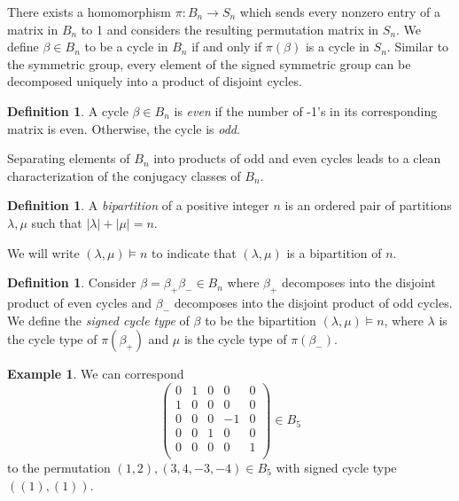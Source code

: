 \documentclass{amsart}
\theoremstyle{plain}
\theoremstyle{definition}
\newtheorem{definition}[theorem]{Definition}
\newtheorem{example}[theorem]{Example}
\begin{document}
There exists a homomorphism $\pi : B_n \rightarrow S_n$ which sends every nonzero entry of a matrix in $B_n$ to 1 and considers the resulting permutation matrix in $S_n$. We define $\beta \in B_n$ to be a cycle in $B_n$ if and only if $\pi(\beta)$ is a cycle in $S_n$. Similar to the symmetric group, every element of the signed symmetric group can be decomposed uniquely into a product of disjoint cycles.

\begin{definition}
    A cycle $\beta \in B_n$ is \textit{even} if the number of -1's in its corresponding matrix is even. Otherwise, the cycle is \textit{odd}.
\end{definition}

Separating elements of $B_n$ into products of odd and even cycles leads to a clean characterization of the conjugacy classes of $B_n$. 

\begin{definition}
A \textit{bipartition} of a positive integer $n$ is an ordered pair of partitions $\lambda, \mu$ such that $|\lambda| + |\mu| = n$. 

\end{definition}
We will write $(\lambda, \mu) \vDash n$ to indicate that $(\lambda, \mu)$ is a bipartition of $n$.

\begin{definition}

    Consider $\beta =  \beta_+ \beta_- \in B_n$ where $\beta_+$ decomposes into the disjoint product of even cycles and $\beta_-$ decomposes into the disjoint product of odd cycles. We define the \textit{signed cycle type} of $\beta$ to be the bipartition $(\lambda, \mu) \vDash n$, where $\lambda$ is the cycle type of $\pi(\beta_+)$ and $\mu$ is the cycle type of $\pi(\beta_-)$.
    
 
\end{definition}

\begin{example}
    We can correspond $$\begin{pmatrix}
    0&1&0&0&0\\
    1&0&0&0&0\\
    0&0&0&-1&0\\
    0&0&1&0&0\\
    0&0&0&0&1\\

    \end{pmatrix}\in B_5$$ to the  permutation $(1,2),(3,4,-3,-4)\in B_5$ with signed cycle type $((1),(1)).$
\end{example} 
\end{document}
